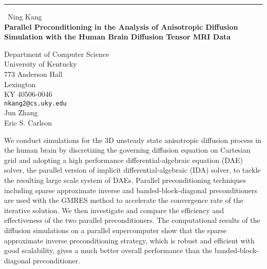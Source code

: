 \documentclass{report}
\begin{document}
\begin{center}
\rule{6in}{1pt} \
{\large Ning Kang \\
{\bf Parallel Preconditioning in the Analysis of Anisotropic Diffusion Simulation with the Human Brain Diffusion Tensor MRI Data}}

Department of Computer Science \\ University of Kentucky \\ 773 Anderson Hall \\ Lexington \\ KY 40506-0046
\\
{\tt nkang2@cs.uky.edu}\\
Jun Zhang\\
Eric S. Carlson\end{center}

We conduct simulations for the 3D unsteady state anisotropic diffusion process in
the human brain by discretizing the governing diffusion
equation on Cartesian grid and adopting a high performance
differential-algebraic
equation (DAE) solver, the parallel version of
implicit differential-algebraic (IDA) solver,
to tackle the resulting large scale system of DAEs.
Parallel preconditioning techniques
including sparse approximate inverse and banded-block-diagonal preconditioners
are used with the GMRES method to accelerate the
convergence rate of the iterative
solution. We then investigate and compare the efficiency and
effectiveness
of the two parallel preconditioners. The computational results of the
diffusion simulations on a parallel supercomputer show that the sparse
approximate inverse preconditioning strategy,
which is robust and efficient with good scalability,
gives a much better overall
performance than the banded-block-diagonal preconditioner.
\end{document}
